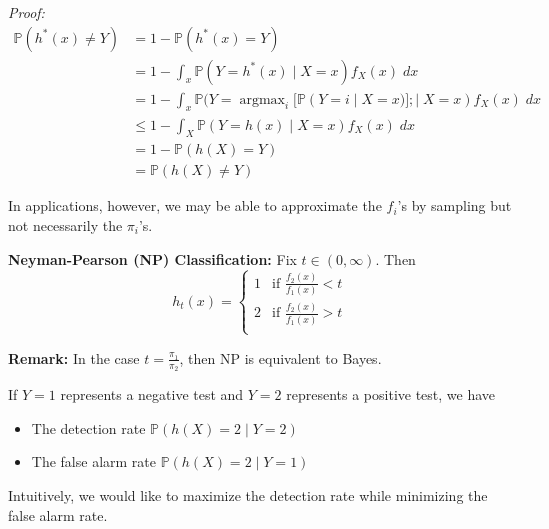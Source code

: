 \documentclass[12pt]{report}
\renewcommand{\P}{\mathbb{P}}
\newcommand*{\tbf}[1]{\ifmmode\mathbf{#1}\else\textbf{#1}\fi}
\DeclareMathOperator*{\argmax}{\arg\max}
\newenvironment*{proof}[1][blue]{
\begin{tcolorbox}[
    parbox=false,
    colback=#1!5!white,
    colframe=#1!75!black,
    breakable
]}
{\end{tcolorbox}}
\newenvironment*{proposition}[1][gray]{
\begin{tcolorbox}[
    parbox=false,
    colback=#1!5!white,
    colframe=#1!75!black,
    breakable
]}
{\end{tcolorbox}}
\begin{document}
\begin{proof}
    \emph{Proof:}
    \begin{align*}
        \P(h^*(x) \neq Y) & = 1 - \P(h^*(x) = Y)                                                             \\
                          & = 1 - \int_x \P(Y = h^*(x) \; | \; X = x) f_X(x)\; dx                            \\
                          & = 1 - \int_x \P(Y = \argmax_i [\P(Y = i \; | \; X = x)]; | \; X = x) f_X(x)\; dx \\
                          & \leq 1 - \int_X \P(Y = h(x) \; | \;X = x) f_X(x)\; dx                            \\
                          & = 1 - \P(h(X) = Y)                                                               \\
                          & = \P(h(X) \neq Y)
    \end{align*}
\end{proof}

In applications, however, we may be able to approximate the $f_i$'s by sampling but not necessarily the $\pi_i$'s.

\begin{proposition}
    \textbf{Neyman-Pearson (NP) Classification:} Fix $t \in (0, \infty)$. Then
    \[h_t(x) = \begin{cases}
            1 & \text{if } \frac{f_2(x)}{f_1(x)} < t \\
            2 & \text{if } \frac{f_2(x)}{f_1(x)} > t \\
        \end{cases}\]
\end{proposition}

\tbf{Remark:} In the case $t = \frac{\pi_1}{\pi_2}$, then NP is equivalent to Bayes.

If $Y = 1$ represents a negative test and $Y = 2$ represents a positive test, we have
\begin{itemize}
    \item The detection rate $\P(h(X) = 2 \; | \; Y = 2)$
    \item The false alarm rate $\P(h(X) = 2 \; | \; Y = 1)$
\end{itemize}

Intuitively, we would like to maximize the detection rate while minimizing the false alarm rate.
\end{document}
